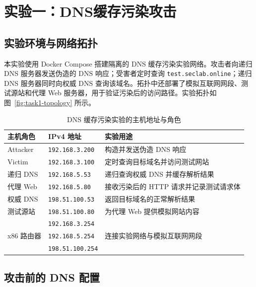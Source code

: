 \section{实验一：DNS缓存污染攻击}

\subsection{实验环境与网络拓扑}

本实验使用 Docker Compose 搭建隔离的 DNS 缓存污染实验网络。攻击者向递归 DNS 服务器发送伪造的 DNS 响应；受害者定时查询 \texttt{test.seclab.online}；递归 DNS 服务器同时向权威 DNS 查询该域名。拓扑中还部署了模拟互联网网段、测试源站和代理 Web 服务器，用于验证污染后的访问路径。实验拓扑如图~\ref{fig:task1-topology} 所示。

\begin{table}[H]
    \centering
    \caption{DNS 缓存污染实验的主机地址与角色}
    \label{tab:task1-dns-hosts}
    \renewcommand{\arraystretch}{1.25}
    \begin{tabularx}{\linewidth}{l l X}
        \toprule
        主机角色 & IPv4 地址 & 实验用途 \\
        \midrule
        Attacker & \texttt{192.168.3.200} & 构造并发送伪造 DNS 响应 \\
        Victim & \texttt{192.168.3.100} & 定时查询目标域名并访问测试网站 \\
        递归 DNS & \texttt{192.168.5.53} & 递归查询权威 DNS 并缓存解析结果 \\
        代理 Web & \texttt{192.168.5.80} & 接收污染后的 HTTP 请求并记录测试请求体 \\
        权威 DNS & \texttt{198.51.100.53} & 返回目标域名的正常解析结果 \\
        测试源站 & \texttt{198.51.100.80} & 为代理 Web 提供模拟网站内容 \\
        \multirow{3}{*}{x86 路由器} & \texttt{192.168.3.254} & \multirow{3}{*}{连接实验网络与模拟互联网网段} \\
        & \texttt{192.168.5.254} & \\
        & \texttt{198.51.100.254} & \\
        \bottomrule
    \end{tabularx}
\end{table}


\subsection{攻击前的 DNS 配置}

